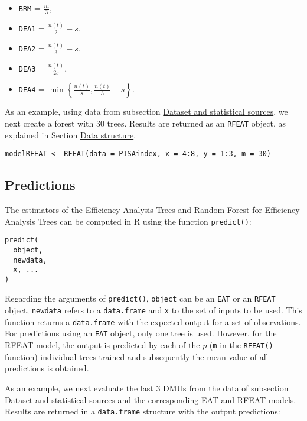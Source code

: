\begin{itemize}
\item
  \texttt{BRM} = \(\frac{m}{3}\),
\item
  \texttt{DEA1} = \(\frac{n\left(t\right)}{2}-s\),
\item
  \texttt{DEA2} = \(\frac{n\left(t\right)}{3}-s\),
\item
  \texttt{DEA3} = \(\frac{n\left(t\right)}{2s}\),
\item
  \texttt{DEA4} = \(\min \left\{\frac{n\left(t\right)}{s}, \frac{n\left(t\right)}{3}-s \right\}\).
\end{itemize}

As an example, using data from subsection \protect\hyperlink{section3.1}{Dataset and statistical sources}, we next create a forest with 30 trees. Results are returned as an \texttt{RFEAT} object, as explained in Section \protect\hyperlink{section3}{Data structure}.

\begin{verbatim}
modelRFEAT <- RFEAT(data = PISAindex, x = 4:8, y = 1:3, m = 30)
\end{verbatim}

\hypertarget{predictions}{%
\subsection{Predictions}\label{predictions}}

The estimators of the Efficiency Analysis Trees and Random Forest for Efficiency Analysis Trees can be computed in R using the function \texttt{predict()}:

\begin{verbatim}
predict(
  object,
  newdata,
  x, ...
)
\end{verbatim}

Regarding the arguments of \texttt{predict()}, \texttt{object} can be an \texttt{EAT} or an \texttt{RFEAT} object, \texttt{newdata} refers to a \texttt{data.frame} and \texttt{x} to the set of inputs to be used. This function returns a \texttt{data.frame} with the expected output for a set of observations. For predictions using an \texttt{EAT} object, only one tree is used. However, for the RFEAT model, the output is predicted by each of the \(p\) (\texttt{m} in the \texttt{RFEAT()} function) individual trees trained and subsequently the mean value of all predictions is obtained.

As an example, we next evaluate the last 3 DMUs from the data of subsection \protect\hyperlink{section3.1}{Dataset and statistical sources} and the corresponding EAT and RFEAT models. Results are returned in a \texttt{data.frame} structure with the output predictions:

